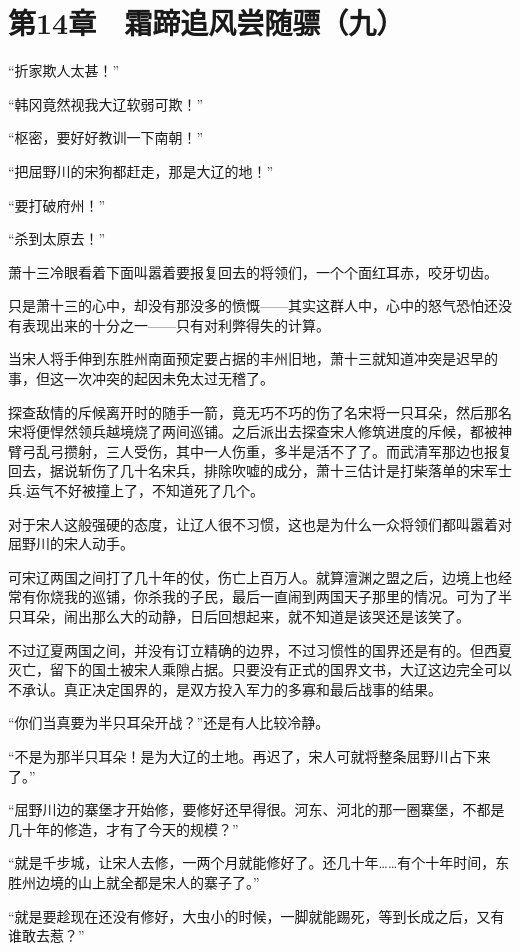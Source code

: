 \section{第14章　霜蹄追风尝随骠（九）}

“折家欺人太甚！”

“韩冈竟然视我大辽软弱可欺！”

“枢密，要好好教训一下南朝！”

“把屈野川的宋狗都赶走，那是大辽的地！”

“要打破府州！”

“杀到太原去！”

萧十三冷眼看着下面叫嚣着要报复回去的将领们，一个个面红耳赤，咬牙切齿。

只是萧十三的心中，却没有那没多的愤慨——其实这群人中，心中的怒气恐怕还没有表现出来的十分之一——只有对利弊得失的计算。

当宋人将手伸到东胜州南面预定要占据的丰州旧地，萧十三就知道冲突是迟早的事，但这一次冲突的起因未免太过无稽了。

探查敌情的斥候离开时的随手一箭，竟无巧不巧的伤了名宋将一只耳朵，然后那名宋将便悍然领兵越境烧了两间巡铺。之后派出去探查宋人修筑进度的斥候，都被神臂弓乱弓攒射，三人受伤，其中一人伤重，多半是活不了了。而武清军那边也报复回去，据说斩伤了几十名宋兵，排除吹嘘的成分，萧十三估计是打柴落单的宋军士兵.运气不好被撞上了，不知道死了几个。

对于宋人这般强硬的态度，让辽人很不习惯，这也是为什么一众将领们都叫嚣着对屈野川的宋人动手。

可宋辽两国之间打了几十年的仗，伤亡上百万人。就算澶渊之盟之后，边境上也经常有你烧我的巡铺，你杀我的子民，最后一直闹到两国天子那里的情况。可为了半只耳朵，闹出那么大的动静，日后回想起来，就不知道是该哭还是该笑了。

不过辽夏两国之间，并没有订立精确的边界，不过习惯性的国界还是有的。但西夏灭亡，留下的国土被宋人乘隙占据。只要没有正式的国界文书，大辽这边完全可以不承认。真正决定国界的，是双方投入军力的多寡和最后战事的结果。

“你们当真要为半只耳朵开战？”还是有人比较冷静。

“不是为那半只耳朵！是为大辽的土地。再迟了，宋人可就将整条屈野川占下来了。”

“屈野川边的寨堡才开始修，要修好还早得很。河东、河北的那一圈寨堡，不都是几十年的修造，才有了今天的规模？”

“就是千步城，让宋人去修，一两个月就能修好了。还几十年……有个十年时间，东胜州边境的山上就全都是宋人的寨子了。”

“就是要趁现在还没有修好，大虫小的时候，一脚就能踢死，等到长成之后，又有谁敢去惹？”

